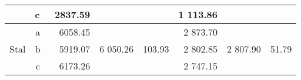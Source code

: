 \begin{table}[H]
{\begin{tabular}{|c|c|r|r|r|r|r|r|}
                                                                                                     & c~       & 2837.59                                                                       &                                                                                     &                                                                                       & 1 113.86                                                                      &                                                                                     &                                                                                       \\ \hline
    \multirow{3}{*}{Stal}                                                                            & a~       & 6058.45                                                                       & \multirow{3}{*}{6 050.26}                                                           & \multirow{3}{*}{103.93}                                                               & 2 873.70                                                                      & \multirow{3}{*}{2 807.90}                                                           & \multirow{3}{*}{51.79}                                                                \\ \cline{2-3} \cline{6-6}
                                                                                                     & b~       & 5919.07                                                                       &                                                                                     &                                                                                       & 2 802.85                                                                      &                                                                                     &                                                                                       \\ \cline{2-3} \cline{6-6}
                                                                                                     & c~       & 6173.26                                                                       &                                                                                     &                                                                                       & 2 747.15                                                                      &                                                                                     &                                                                                       \\ \hline
    \end{tabular}%
    }
    \end{table}